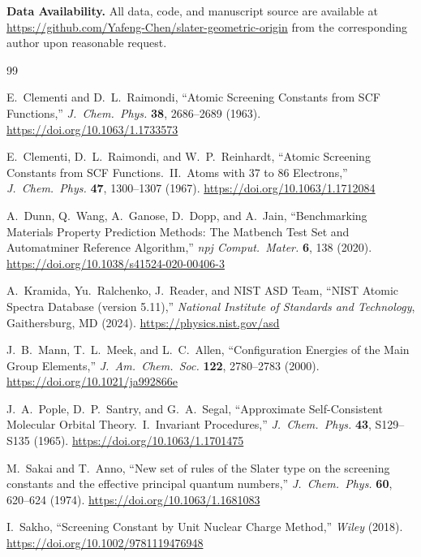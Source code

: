\documentclass[11pt,a4paper]{article}
\begin{document}
\textbf{Data Availability.} All data, code, and manuscript source are available at \url{https://github.com/Yafeng-Chen/slater-geometric-origin} from the corresponding author upon reasonable request.

\begin{thebibliography}{99}

E.~Clementi and D.~L.~Raimondi, ``Atomic Screening Constants from SCF Functions,'' \textit{J.\ Chem.\ Phys.} \textbf{38}, 2686--2689 (1963). \url{https://doi.org/10.1063/1.1733573}

E.~Clementi, D.~L.~Raimondi, and W.~P.~Reinhardt, ``Atomic Screening Constants from SCF Functions.\ II.\ Atoms with 37 to 86 Electrons,'' \textit{J.\ Chem.\ Phys.} \textbf{47}, 1300--1307 (1967). \url{https://doi.org/10.1063/1.1712084}

A.~Dunn, Q.~Wang, A.~Ganose, D.~Dopp, and A.~Jain, ``Benchmarking Materials Property Prediction Methods: The Matbench Test Set and Automatminer Reference Algorithm,'' \textit{npj Comput.\ Mater.} \textbf{6}, 138 (2020). \url{https://doi.org/10.1038/s41524-020-00406-3}

A.~Kramida, Yu.~Ralchenko, J.~Reader, and NIST ASD Team, ``NIST Atomic Spectra Database (version 5.11),'' \textit{National Institute of Standards and Technology}, Gaithersburg, MD (2024). \url{https://physics.nist.gov/asd}

J.~B.~Mann, T.~L.~Meek, and L.~C.~Allen, ``Configuration Energies of the Main Group Elements,'' \textit{J.\ Am.\ Chem.\ Soc.} \textbf{122}, 2780--2783 (2000). \url{https://doi.org/10.1021/ja992866e}

J.~A.~Pople, D.~P.~Santry, and G.~A.~Segal, ``Approximate Self-Consistent Molecular Orbital Theory.\ I.\ Invariant Procedures,'' \textit{J.\ Chem.\ Phys.} \textbf{43}, S129--S135 (1965). \url{https://doi.org/10.1063/1.1701475}

M.~Sakai and T.~Anno, ``New set of rules of the Slater type on the screening constants and the effective principal quantum numbers,'' \textit{J.\ Chem.\ Phys.} \textbf{60}, 620--624 (1974). \url{https://doi.org/10.1063/1.1681083}

I.~Sakho, ``Screening Constant by Unit Nuclear Charge Method,'' \textit{Wiley} (2018). \url{https://doi.org/10.1002/9781119476948}


\end{thebibliography}
\end{document}

